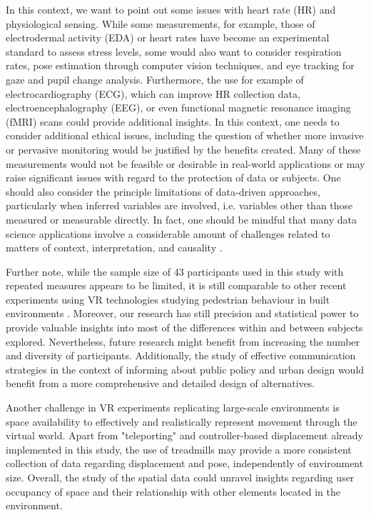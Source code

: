 In this context, we want to point out some issues with heart rate (HR) and physiological sensing. While some measurements, for example, those of electrodermal activity (EDA) or heart rates have become an experimental standard to assess stress levels, some would also want to consider respiration rates, pose estimation through computer vision techniques, and eye tracking for gaze and pupil change analysis. Furthermore, the use for example of electrocardiography (ECG), which can improve HR collection data, electroencephalography (EEG), or even functional magnetic resonance imaging (fMRI) scans could provide additional insights. In this context, one needs to consider additional ethical issues, including the question of whether more invasive or pervasive monitoring would be justified by the benefits created. Many of these measurements would not be feasible or desirable in real-world applications or may raise significant issues with regard to the protection of data or subjects. One should also consider the principle limitations of data-driven approaches, particularly when inferred variables are involved, i.e. variables other than those measured or measurable directly. In fact, one should be mindful that many data science applications involve a considerable amount of challenges related to matters of context, interpretation, and causality \cite{Caldarelli2023}.

Further note, while the sample size of 43 participants used in this study with repeated measures appears to be limited, it is still comparable to other recent experiments using VR technologies studying pedestrian behaviour in built environments \cite{Oselinsky2023,Angulo2023, Guo2022, AstanehAsl2023, Qi2023, Zito2015, Feldstein2020}. Moreover, our research has still precision and statistical power to provide valuable insights into most of the differences within and between subjects explored. Nevertheless, future research might benefit from increasing the number and diversity of participants.
Additionally, the study of effective communication strategies in the context of informing about public policy and urban design would benefit from a more comprehensive and detailed design of alternatives.

Another challenge in VR experiments replicating large-scale environments is space availability to effectively and realistically represent movement through the virtual world. Apart from "teleporting" and controller-based displacement already implemented in this study, the use of treadmills may provide a more consistent collection of data regarding displacement and pose, independently of environment size. Overall, the study of the spatial data could unravel insights regarding user occupancy of space and their relationship with other elements located in the environment.

